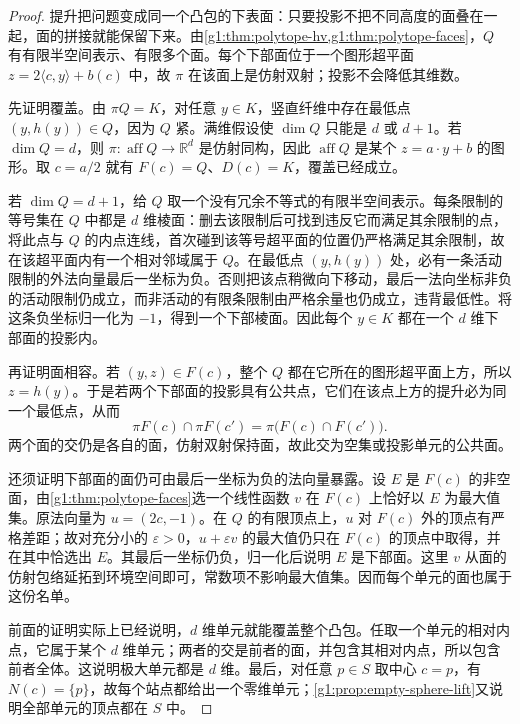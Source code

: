 \begin{proof}
	提升把问题变成同一个凸包的下表面：只要投影不把不同高度的面叠在一起，面的拼接就能保留下来。由\cref{g1:thm:polytope-hv,g1:thm:polytope-faces}，\(Q\) 有有限半空间表示、有限多个面。每个下部面位于一个图形超平面 \(z=2\langle c,y\rangle+b(c)\) 中，故 \(\pi\) 在该面上是仿射双射；投影不会降低其维数。

	先证明覆盖。由 \(\pi Q=K\)，对任意 \(y\in K\)，竖直纤维中存在最低点 \((y,h(y))\in Q\)，因为 \(Q\) 紧。满维假设使 \(\dim Q\) 只能是 \(d\) 或 \(d+1\)。若 \(\dim Q=d\)，则 \(\pi:\operatorname{aff}Q\to\mathbb R^d\) 是仿射同构，因此 \(\operatorname{aff}Q\) 是某个 \(z=a\cdot y+b\) 的图形。取 \(c=a/2\) 就有 \(F(c)=Q\)、\(D(c)=K\)，覆盖已经成立。

	若 \(\dim Q=d+1\)，给 \(Q\) 取一个没有冗余不等式的有限半空间表示。每条限制的等号集在 \(Q\) 中都是 \(d\) 维棱面：删去该限制后可找到违反它而满足其余限制的点，将此点与 \(Q\) 的内点连线，首次碰到该等号超平面的位置仍严格满足其余限制，故在该超平面内有一个相对邻域属于 \(Q\)。在最低点 \((y,h(y))\) 处，必有一条活动限制的外法向量最后一坐标为负。否则把该点稍微向下移动，最后一法向坐标非负的活动限制仍成立，而非活动的有限条限制由严格余量也仍成立，违背最低性。将这条负坐标归一化为 \(-1\)，得到一个下部棱面。因此每个 \(y\in K\) 都在一个 \(d\) 维下部面的投影内。

	再证明面相容。若 \((y,z)\in F(c)\)，整个 \(Q\) 都在它所在的图形超平面上方，所以 \(z=h(y)\)。于是若两个下部面的投影具有公共点，它们在该点上方的提升必为同一个最低点，从而
	\[
		\pi F(c)\cap\pi F(c')=\pi\bigl(F(c)\cap F(c')\bigr).
	\]
	两个面的交仍是各自的面，仿射双射保持面，故此交为空集或投影单元的公共面。

	还须证明下部面的面仍可由最后一坐标为负的法向量暴露。设 \(E\) 是 \(F(c)\) 的非空面，由\cref{g1:thm:polytope-faces}选一个线性函数 \(v\) 在 \(F(c)\) 上恰好以 \(E\) 为最大值集。原法向量为 \(u=(2c,-1)\)。在 \(Q\) 的有限顶点上，\(u\) 对 \(F(c)\) 外的顶点有严格差距；故对充分小的 \(\varepsilon>0\)，\(u+\varepsilon v\) 的最大值仍只在 \(F(c)\) 的顶点中取得，并在其中恰选出 \(E\)。其最后一坐标仍负，归一化后说明 \(E\) 是下部面。这里 \(v\) 从面的仿射包络延拓到环境空间即可，常数项不影响最大值集。因而每个单元的面也属于这份名单。

	前面的证明实际上已经说明，\(d\) 维单元就能覆盖整个凸包。任取一个单元的相对内点，它属于某个 \(d\) 维单元；两者的交是前者的面，并包含其相对内点，所以包含前者全体。这说明极大单元都是 \(d\) 维。最后，对任意 \(p\in S\) 取中心 \(c=p\)，有 \(N(c)=\{p\}\)，故每个站点都给出一个零维单元；\cref{g1:prop:empty-sphere-lift}又说明全部单元的顶点都在 \(S\) 中。
\end{proof}

